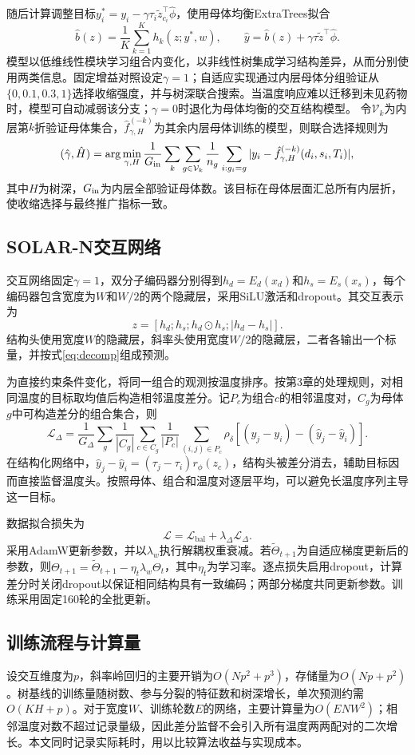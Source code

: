 随后计算调整目标$y_i^*=y_i-\gamma\tau_i\tilde z_{c_i}^{\top}\hat\phi$，使用母体均衡ExtraTrees拟合
\begin{equation}
\hat b(z)=\frac1K\sum_{k=1}^{K}h_k(z;y^*,w),\qquad
\hat y=\hat b(z)+\gamma\tau\tilde z^\top\hat\phi.
\end{equation}
模型以低维线性模块学习组合内变化，以非线性树集成学习结构差异，从而分别使用两类信息。固定增益对照设定$\gamma=1$；自适应实现通过内层母体分组验证从$\{0,0.1,0.3,1\}$选择收缩强度，并与树深联合搜索。当温度响应难以迁移到未见药物时，模型可自动减弱该分支；$\gamma=0$时退化为母体均衡的交互结构模型。
令$\mathcal V_k$为内层第$k$折验证母体集合，$\hat f^{(-k)}_{\gamma,H}$为其余内层母体训练的模型，则联合选择规则为
\begin{equation}
(\hat\gamma,\hat H)=\arg\min_{\gamma,H}\frac1{G_{\rm in}}
\sum_k\sum_{g\in\mathcal V_k}\frac1{n_g}\sum_{i:g_i=g}
|y_i-\hat f^{(-k)}_{\gamma,H}(d_i,s_i,T_i)|,
\end{equation}
其中$H$为树深，$G_{\rm in}$为内层全部验证母体数。该目标在母体层面汇总所有内层折，使收缩选择与最终推广指标一致。


\subsection{SOLAR-N交互网络}
交互网络固定$\gamma=1$，双分子编码器分别得到$h_d=E_d(x_d)$和$h_s=E_s(x_s)$，每个编码器包含宽度为$W$和$W/2$的两个隐藏层，采用SiLU激活和dropout。其交互表示为
\begin{equation}
z=[h_d;h_s;h_d\odot h_s;|h_d-h_s|].
\end{equation}
结构头使用宽度$W$的隐藏层，斜率头使用宽度$W/2$的隐藏层，二者各输出一个标量，并按式\eqref{eq:decomp}组成预测。

为直接约束条件变化，将同一组合的观测按温度排序。按第3章的处理规则，对相同温度的目标取均值后构造相邻温度差分。记$P_c$为组合$c$的相邻温度对，$C_g$为母体$g$中可构造差分的组合集合，则
\begin{equation}\label{eq:delta}
\mathcal L_\Delta=\frac1{G_\Delta}\sum_g\frac1{|C_g|}\sum_{c\in C_g}
\frac1{|P_c|}\sum_{(i,j)\in P_c}
\rho_\delta\left[(y_j-y_i)-(\hat y_j-\hat y_i)\right].
\end{equation}
在结构化网络中，$\hat y_j-\hat y_i=(\tau_j-\tau_i)r_\phi(z_c)$，结构头被差分消去，辅助目标因而直接监督温度头。按照母体、组合和温度对逐层平均，可以避免长温度序列主导这一目标。

数据拟合损失为
\begin{equation}\label{eq:loss}
\mathcal L=\mathcal L_{\mathrm{bal}}+\lambda_\Delta\mathcal L_\Delta.
\end{equation}
采用AdamW更新参数，并以$\lambda_w$执行解耦权重衰减。若$\tilde\Theta_{t+1}$为自适应梯度更新后的参数，则$\Theta_{t+1}=\tilde\Theta_{t+1}-\eta_t\lambda_w\Theta_t$，其中$\eta_t$为学习率。逐点损失启用dropout，计算差分时关闭dropout以保证相同结构具有一致编码；两部分梯度共同更新参数。训练采用固定160轮的全批更新。

\subsection{训练流程与计算量}


设交互维度为$p$，斜率岭回归的主要开销为$O(Np^2+p^3)$，存储量为$O(Np+p^2)$。树基线的训练量随树数、参与分裂的特征数和树深增长，单次预测约需$O(KH+p)$。对于宽度$W$、训练轮数$E$的网络，主要计算量为$O(ENW^2)$；相邻温度对数不超过记录量级，因此差分监督不会引入所有温度两两配对的二次增长。本文同时记录实际耗时，用以比较算法收益与实现成本。
